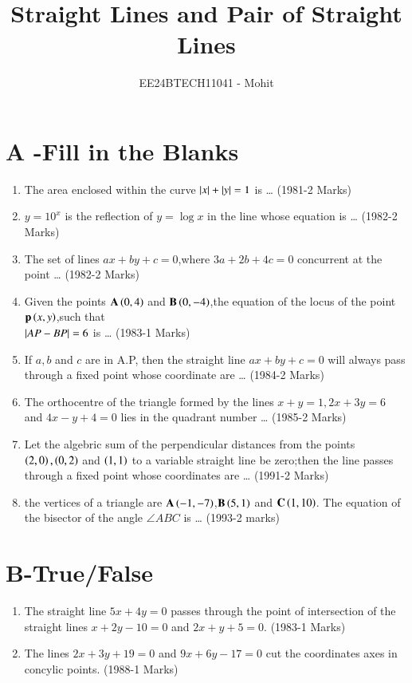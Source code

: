 \documentclass[journal,12pt,twocolumn]{IEEEtran}
\theoremstyle{remark}
\begin{document}

\vspace{3cm}

\title{Straight Lines and Pair of Straight Lines}
\author{EE24BTECH11041 - Mohit}
\maketitle
\newpage
\bigskip

\renewcommand{\thefigure}{\theenumi}
\renewcommand{\thetable}{\theenumi}

\section {A -Fill in the Blanks}
\begin{enumerate}
	\item The area enclosed within the curve $\left\vert x\right\vert+\left\vert y\right\vert =1$ is \dots
    \hfill(1981-2 Marks)
    \item $y = 10^x $ is the reflection of $y=\log x$ in the line whose equation is \dots
    \hfill(1982-2 Marks)
    \item The set of lines $ax+by+c=0$,where $3a+2b+4c=0$ concurrent at the point \dots
    \hfill(1982-2 Marks)
    \item Given the points $\mathbf{A}\left(0,4\right)$ and $\mathbf{B}\left(0,-4\right)$,the equation of the locus of the point $\mathbf{p}\left(x,y\right)$,such that \\
    $\left\vert AP-BP\right\vert=6$ is \dots
    \hfill(1983-1 Marks)
    \item If $a,b$ and $c$ are in A.P, then the straight line $ax +by +c=0$ will always pass through a fixed point whose coordinate are \dots
    \hfill(1984-2 Marks)
    \item The orthocentre of the triangle formed by the lines $x+y=1,2x +3y=6$ and $4x-y+4=0$ lies in the quadrant number \dots
    \hfill(1985-2 Marks)
    \item Let the algebric sum of the perpendicular distances from the points $\left(2,0\right),\left(0,2\right)$ and $\left(1,1\right)$ to a variable straight line be zero;then the line passes through a fixed point whose coordinates are \dots
    \hfill(1991-2 Marks)
    \item the vertices of a triangle are $\mathbf{A}\left(-1,-7\right)$,$\mathbf{B}\left(5,1\right)$ and $\mathbf{C}\left(1,10\right)$. The equation of the bisector of the angle $\angle{ABC}$ is \dots
    \hfill(1993-2 marks)
\end{enumerate}
\section {B-True/False}
\begin{enumerate}
    \item The straight line $5x+4y=0$ passes through the point of intersection of the straight lines $x+2y-10=0$ and $2x+y+5=0$.
    \hfill(1983-1 Marks)
    \item The lines $2x+3y+19=0$ and $9x+6y-17=0$ cut the coordinates axes in concylic points.
    \hfill(1988-1 Marks)
\end{enumerate}
\end{document}
